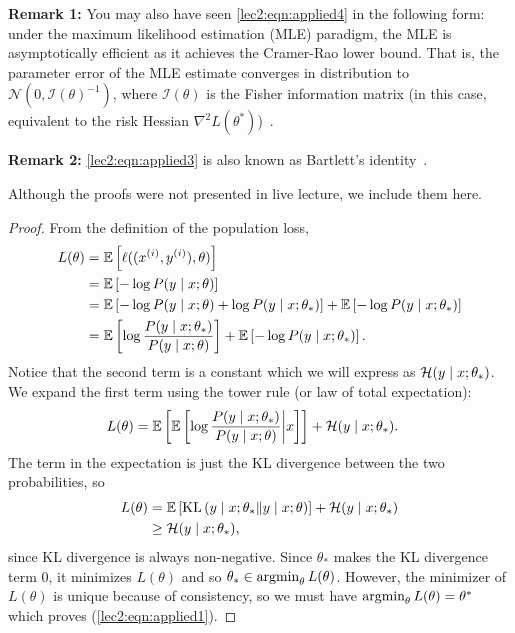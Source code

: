 \textbf{Remark 1:} You may also have seen \eqref{lec2:eqn:applied4} in the following form: under the maximum likelihood estimation (MLE) paradigm, the MLE is asymptotically efficient as it achieves the Cramer-Rao lower bound. That is, the parameter error of the MLE estimate converges in distribution to $\mathcal{N}(0, \mathcal{I}(\theta)^{-1})$, where $\mathcal{I}(\theta)$ is the Fisher information matrix (in this case, equivalent to the risk Hessian $\nabla^2 L(\theta^*)$)~\cite{rice2006mathematical}.

\textbf{Remark 2:} \eqref{lec2:eqn:applied3} is also known as Bartlett's identity~\cite{percynotes}.

Although the proofs were not presented in live lecture, we include them here.

\begin{proof}
From the definition of the population loss,
\begin{align}
    L(\theta) &= \operatorname*{\mathbb{E}} \left[ \ell((x^{(i)}, y^{(i)}), \theta) \right]\\
    &= \operatorname*{\mathbb{E}} \left[ - \log P(y \mid x; \theta) \right] \\
    &= \operatorname*{\mathbb{E}} \left[ - \log P(y \mid x; \theta) + \log P(y \mid x; \theta_*) \right] + \operatorname*{\mathbb{E}} \left[ - \log P(y \mid x; \theta_*) \right] \\
    &= \operatorname*{\mathbb{E}} \left[ \log \frac{P(y \mid x; \theta_*)}{P(y \mid x; \theta)} \right] + \operatorname*{\mathbb{E}} \left[ - \log P(y \mid x; \theta_*) \right].
\end{align}
Notice that the second term is a constant which we will express as $\mathcal H(y \mid x; \theta_*)$. We expand the first term using the tower rule (or law of total expectation):
\begin{align}
    L(\theta) &= \operatorname*{\mathbb{E}} \left[ \operatorname*{\mathbb{E}} \left[ \log \frac{P(y \mid x; \theta_*)}{P(y \mid x; \theta)} \biggr\vert x \right] \right] + \mathcal H(y \mid x; \theta_*).
\end{align}
The term in the expectation is just the KL divergence between the two probabilities, so 
\begin{align}
    L(\theta) &= \operatorname*{\mathbb{E}} \left[ \operatorname{KL} \left( y \mid x; \theta_* \| y \mid x; \theta \right) \right] + \mathcal H(y \mid x; \theta_*) \\
    &\geq \mathcal H(y \mid x; \theta_*),
\end{align}
since KL divergence is always non-negative. Since $\theta_*$ makes the KL divergence term 0, it minimizes $L(\theta)$ and so $\theta_* \in \operatorname*{\textup{argmin}}_\theta L(\theta)$. However, the minimizer of $L(\theta)$ is unique because of consistency, so  we must have $\operatorname*{\textup{argmin}}_\theta L(\theta) = \theta^*$ which proves (\ref{lec2:eqn:applied1}).


\end{proof}
